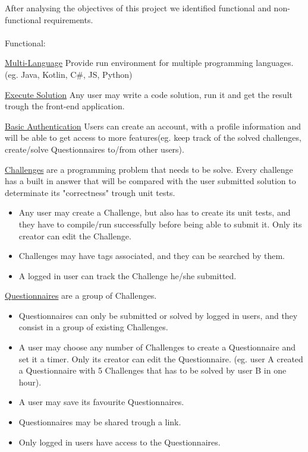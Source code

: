 \renewcommand{\labelitemii}{$\star$}
After analysing the objectives of this project we identified functional and non-functional requirements.
\\
\\
Functional:
\begin{description}[font=$\bullet$~\normalfont\scshape\color{red!50!black}]
\item \underline{Multi-Language} Provide run environment for multiple programming languages.(eg. Java, Kotlin, C\#, JS, Python)

\item \underline{Execute Solution} Any user may write a code solution, run it and get the result trough the front-end application.

\item \underline {Basic Authentication} Users can create an account, with a profile information and will be able to get access to more features(eg. keep track of the solved challenges, create/solve Questionnaires to/from other users).

\item \underline{Challenges} are a programming problem that needs to be solve. Every challenge has a built in answer that will be compared with the user submitted solution to determinate its "correctness" trough unit tests.
   \begin{itemize}
     \item Any user may create a Challenge, but also has to create its unit tests, and they have to compile/run successfully before being able to submit it. Only its creator can edit the Challenge.
     \item Challenges may have tags associated, and they can be searched by them.
     \item A logged in user can track the Challenge he/she submitted.
   \end{itemize}
\item \underline{Questionnaires} are a group of Challenges.
	\begin{itemize}
	\item Questionnaires can only be submitted or solved by logged in users, and they consist in a group of existing Challenges.
    \item A user may choose any number of Challenges to create a Questionnaire and set it a timer. Only its creator can edit the Questionnaire.
    (eg. user A created a Questionnaire with 5 Challenges that has to be solved by user B in one hour).
    \item A user may save its favourite Questionnaires.
    \item Questionnaires may be shared trough a link.
    \item Only logged in users have access to the Questionnaires.
	\end{itemize}
\end{description}


